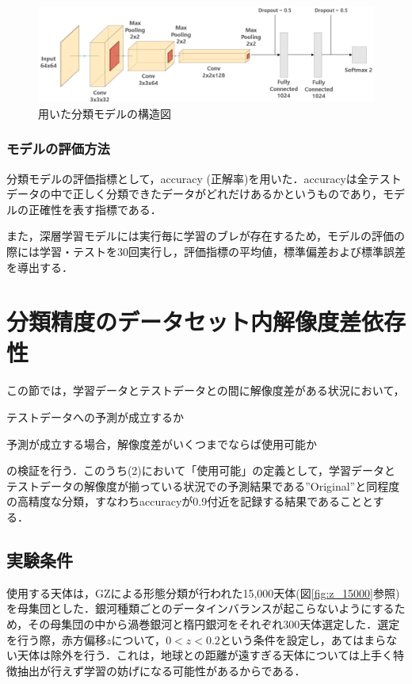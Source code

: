 \documentclass[a4j, 11pt]{jreport}
\begin{document}
\begin{figure}[h]
	\centering
	\includegraphics[width=14cm]{images/model_shape.png}
	\caption{用いた分類モデルの構造図}
	\label{fig:model_shape_2}
\end{figure}
 
\subsubsection{モデルの評価方法}
分類モデルの評価指標として，accuracy (正解率)を用いた．accuracyは全テストデータの中で正しく分類できたデータがどれだけあるかというものであり，モデルの正確性を表す指標である．

また，深層学習モデルには実行毎に学習のブレが存在するため，モデルの評価の際には学習・テストを30回実行し，評価指標の平均値，標準偏差および標準誤差を導出する．

\section{分類精度のデータセット内解像度差依存性}
この節では，学習データとテストデータとの間に解像度差がある状況において，
\begin{inparaenum}[(1)]
  \item テストデータへの予測が成立するか
  \item 予測が成立する場合，解像度差がいくつまでならば使用可能か
\end{inparaenum}
の検証を行う．このうち(2)において「使用可能」の定義として，学習データとテストデータの解像度が揃っている状況での予測結果である''Original''と同程度の高精度な分類，すなわちaccuracyが0.9付近を記録する結果であることとする．

\subsection{実験条件}
使用する天体は，GZによる形態分類が行われた15,000天体(図\ref{fig:z_15000}参照)を母集団とした．銀河種類ごとのデータインバランスが起こらないようにするため，その母集団の中から渦巻銀河と楕円銀河をそれぞれ300天体選定した．選定を行う際，赤方偏移$z$について，$0 < z < 0.2$という条件を設定し，あてはまらない天体は除外を行う．これは，地球との距離が遠すぎる天体については上手く特徴抽出が行えず学習の妨げになる可能性があるからである．
\end{document}

